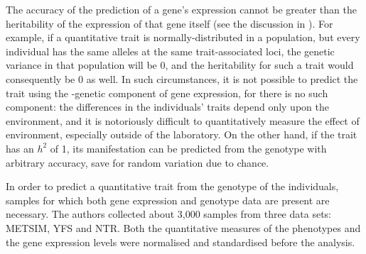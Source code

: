 \documentclass[../main.tex]{subfiles}
\begin{document}
The accuracy of the prediction of a gene's expression cannot be greater 
than the heritability of the expression of that gene itself (see the 
discussion in ). For example, if a quantitative 
trait is normally-distributed in a population, but every individual has 
the same alleles at the same trait-associated loci, the genetic variance 
in that population will be $0$, and the heritability for such a trait 
would consequently be $0$ as well. In such circumstances, it is not 
possible to predict the trait using the \cis-genetic component of gene 
expression, for there is no such component: the differences in the 
individuals' traits depend only upon the environment, and it is 
notoriously difficult to quantitatively measure the effect of 
environment, especially outside of the laboratory. On the other hand, if 
the trait has an $h^2$ of 1, its manifestation can be predicted from the 
genotype with arbitrary accuracy, save for random variation due to 
chance.

In order to predict a quantitative trait from the genotype of the 
individuals, samples for which both gene expression and genotype data 
are present are necessary. The authors collected about 3,000 samples 
from three data sets: METSIM, YFS and NTR. Both the quantitative 
measures of the phenotypes and the gene expression levels were 
normalised and standardised before the analysis.

\end{document}

